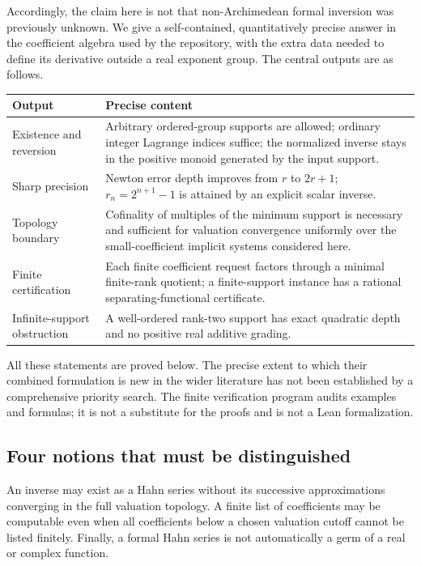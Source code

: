 \documentclass[11pt,a4paper]{article}
\theoremstyle{definition}
\theoremstyle{remark}
\begin{document}
Accordingly, the claim here is not that non-Archimedean formal inversion was
previously unknown. We give a self-contained, quantitatively precise answer
in the coefficient algebra used by the repository, with the extra data
needed to define its derivative outside a real exponent group. The central
outputs are as follows.

\begin{center}
\begin{tabular}{@{}p{}p{}@{}}
\toprule
Output & Precise content\\
\midrule
Existence and reversion & Arbitrary ordered-group supports are allowed;
ordinary integer Lagrange indices suffice; the normalized inverse stays in
the positive monoid generated by the input support.\\[0.45em]
Sharp precision & Newton error depth improves from $r$ to $2r+1$;
$r_n=2^{n+1}-1$ is attained by an explicit scalar inverse.\\[0.45em]
Topology boundary & Cofinality of multiples of the minimum support is
necessary and sufficient for valuation convergence uniformly over the
small-coefficient implicit systems considered here.\\[0.45em]
Finite certification & Each finite coefficient request factors through a
minimal finite-rank quotient; a finite-support instance has a rational
separating-functional certificate.\\[0.45em]
Infinite-support obstruction & A well-ordered rank-two support has exact
quadratic depth and no positive real additive grading.\\
\bottomrule
\end{tabular}
\end{center}

All these statements are proved below. The precise extent to which their
combined formulation is new in the wider literature has not been established
by a comprehensive priority search. The finite verification program audits
examples and formulas; it is not a substitute for the proofs and is not a
Lean formalization.

\subsection{Four notions that must be distinguished}
An inverse may exist as a Hahn series without its successive approximations
converging in the full valuation topology. A finite list of coefficients
may be computable even when all coefficients below a chosen valuation
cutoff cannot be listed finitely. Finally, a formal Hahn series is not
automatically a germ of a real or complex function.
\end{document}
